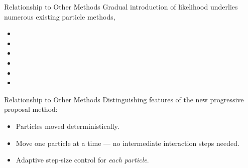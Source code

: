 \documentclass{beamer}
\begin{document}
\begin{frame}{Relationship to Other Methods}
Gradual introduction of likelihood underlies numerous existing particle methods,
{\tiny
\begin{itemize}
 \item {}
 \item {}
 \item {}
 \item {}
 \item {}
 \item {}
\end{itemize}
}
\end{frame}
\begin{frame}{Relationship to Other Methods}
Distinguishing features of the new progressive proposal method:
\begin{itemize}
 \item Particles moved deterministically.
 \item Move one particle at a time --- no intermediate interaction steps needed.
 \item Adaptive step-size control for \emph{each particle}.
\end{itemize}
\end{frame}
\end{document}
